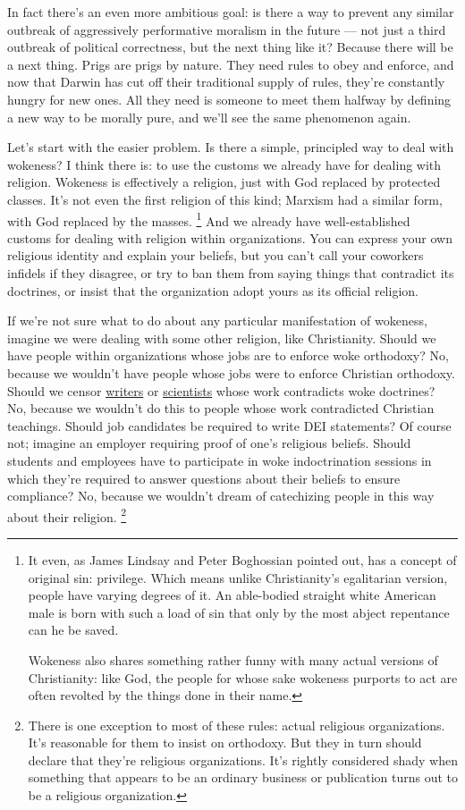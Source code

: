 In fact there's an even more ambitious goal: is there a way to prevent
any similar outbreak of aggressively performative moralism in the future
--- not just a third outbreak of political correctness, but the next
thing like it? Because there will be a next thing. Prigs are prigs by
nature. They need rules to obey and enforce, and now that Darwin has cut
off their traditional supply of rules, they're constantly hungry for new
ones. All they need is someone to meet them halfway by defining a new
way to be morally pure, and we'll see the same phenomenon again.

Let's start with the easier problem. Is there a simple, principled way
to deal with wokeness? I think there is: to use the customs we already
have for dealing with religion. Wokeness is effectively a religion, just
with God replaced by protected classes. It's not even the first religion
of this kind; Marxism had a similar form, with God replaced by the
masses. \footnote{It even, as James Lindsay and Peter Boghossian pointed out, has
a concept of original sin: privilege. Which means unlike Christianity's
egalitarian version, people have varying degrees of it. An able-bodied
straight white American male is born with such a load of sin that only
by the most abject repentance can he be saved.

Wokeness also shares something rather funny with many actual versions of
Christianity: like God, the people for whose sake wokeness purports to
act are often revolted by the things done in their name.} And we already have well-established
customs for dealing with religion within organizations. You can express
your own religious identity and explain your beliefs, but you can't call
your coworkers infidels if they disagree, or try to ban them from saying
things that contradict its doctrines, or insist that the organization
adopt yours as its official religion.

If we're not sure what to do about any particular manifestation of
wokeness, imagine we were dealing with some other religion, like
Christianity. Should we have people within organizations whose jobs are
to enforce woke orthodoxy? No, because we wouldn't have people whose
jobs were to enforce Christian orthodoxy. Should we censor
\href{https://www.telegraph.co.uk/news/2023/02/17/roald-dahl-books-rewritten-offensive-matilda-witches-twits/}{writers}
or
\href{https://x.com/KoustaStavroula/status/1562034502897106946}{scientists}
whose work contradicts woke doctrines? No, because we wouldn't do this
to people whose work contradicted Christian teachings. Should job
candidates be required to write DEI statements? Of course not; imagine
an employer requiring proof of one's religious beliefs. Should students
and employees have to participate in woke indoctrination sessions in
which they're required to answer questions about their beliefs to ensure
compliance? No, because we wouldn't dream of catechizing people in this
way about their religion. \footnote{There is one exception to most of these rules: actual religious
organizations. It's reasonable for them to insist on orthodoxy. But they
in turn should declare that they're religious organizations. It's
rightly considered shady when something that appears to be an ordinary
business or publication turns out to be a religious organization.}

